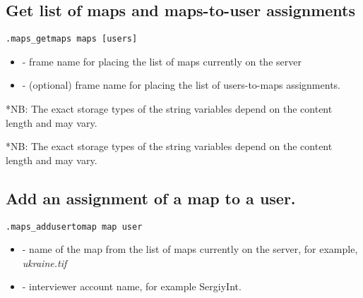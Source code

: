 \subsection{Get list of maps and maps-to-user assignments}
\begin{lstlisting}[style=CommandLineStyle]
.maps_getmaps maps [users]
\end{lstlisting}

\paramsheader
\begin{itemize}
  \item {} - frame name for placing the list of maps currently on the server
  \item {} - (optional) frame name for placing the list of users-to-maps assignments.
\end{itemize}

\begin{compactitem}
\end{compactitem}
*NB: The exact storage types of the string variables depend on the content
     length and may vary.

\begin{compactitem}
\end{compactitem}
*NB: The exact storage types of the string variables depend on the content
     length and may vary.


\subsection{Add an assignment of a map to a user.}
\begin{lstlisting}[style=CommandLineStyle]
.maps_addusertomap map user
\end{lstlisting}

\paramsheader
\begin{itemize}
  \item {} - name of the map from the list of maps
        currently on the server, for example, \textquotedbl
        \textit{ukraine.tif}\textquotedbl
  \item {} - interviewer account name, for example
        \textquotedbl SergiyInt\textquotedbl.
\end{itemize}


